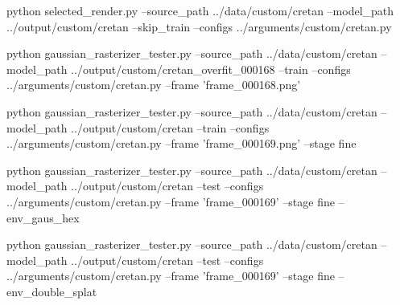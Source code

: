 python selected_render.py --source_path ../data/custom/cretan --model_path ../output/custom/cretan --skip_train --configs ../arguments/custom/cretan.py


python gaussian_rasterizer_tester.py --source_path ../data/custom/cretan --model_path ../output/custom/cretan_overfit_000168 --train --configs ../arguments/custom/cretan.py --frame 'frame_000168.png'

python gaussian_rasterizer_tester.py --source_path ../data/custom/cretan --model_path ../output/custom/cretan --train --configs ../arguments/custom/cretan.py --frame 'frame_000169.png' --stage fine

python gaussian_rasterizer_tester.py --source_path ../data/custom/cretan --model_path ../output/custom/cretan --test --configs ../arguments/custom/cretan.py --frame 'frame_000169' --stage fine --env_gaus_hex

python gaussian_rasterizer_tester.py --source_path ../data/custom/cretan --model_path ../output/custom/cretan --test --configs ../arguments/custom/cretan.py --frame 'frame_000169' --stage fine --env_double_splat
